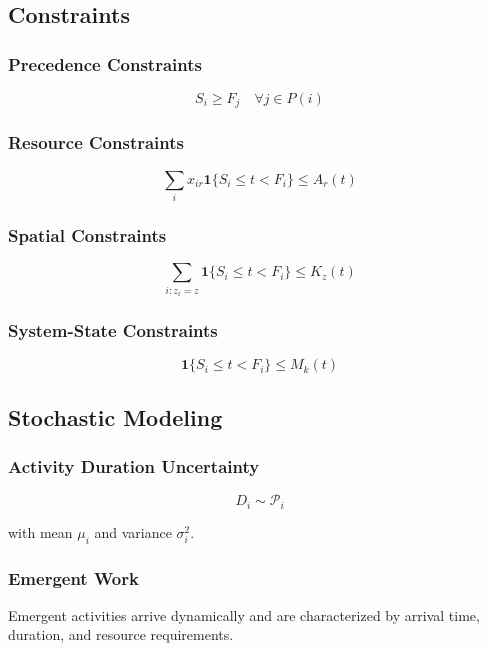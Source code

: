 \subsection{Constraints}

\subsubsection{Precedence Constraints}
\begin{equation}
S_i \ge F_j \quad \forall j \in P(i)
\end{equation}

\subsubsection{Resource Constraints}
\begin{equation}
\sum_i x_{ir} \mathbf{1}\{S_i \le t < F_i\} \le A_r(t)
\end{equation}

\subsubsection{Spatial Constraints}
\begin{equation}
\sum_{i: z_i = z} \mathbf{1}\{S_i \le t < F_i\} \le K_z(t)
\end{equation}

\subsubsection{System-State Constraints}
\begin{equation}
\mathbf{1}\{S_i \le t < F_i\} \le M_k(t)
\end{equation}

\subsection{Stochastic Modeling}

\subsubsection{Activity Duration Uncertainty}
\begin{equation}
D_i \sim \mathcal{P}_i
\end{equation}

with mean $\mu_i$ and variance $\sigma_i^2$.

\subsubsection{Emergent Work}
Emergent activities arrive dynamically and are characterized by arrival time, duration, and resource requirements.

